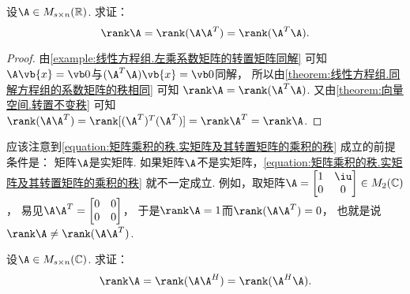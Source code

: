 \begin{example}
设\(\A \in M_{s \times n}(\mathbb{R})\).
求证：\begin{equation}\label{equation:矩阵乘积的秩.实矩阵及其转置矩阵的乘积的秩}
	\rank\A = \rank(\A \A^T) = \rank(\A^T \A).
\end{equation}
\begin{proof}
由\cref{example:线性方程组.左乘系数矩阵的转置矩阵同解} 可知
\(\A \vb{x} = \vb0\)与\((\A^T \A) \vb{x} = \vb0\)同解，
所以由\cref{theorem:线性方程组.同解方程组的系数矩阵的秩相同} 可知
\(\rank\A = \rank(\A^T \A)\).
又由\cref{theorem:向量空间.转置不变秩} 可知
\(\rank(\A \A^T)
= \rank[(\A^T)^T (\A^T)]
= \rank\A^T
= \rank\A\).
\end{proof}
\end{example}
\begin{remark}
应该注意到\cref{equation:矩阵乘积的秩.实矩阵及其转置矩阵的乘积的秩} 成立的前提条件是：
矩阵\(\A\)是实矩阵.
如果矩阵\(\A\)不是实矩阵，\cref{equation:矩阵乘积的秩.实矩阵及其转置矩阵的乘积的秩} 就不一定成立.
例如，取矩阵\(\A = \begin{bmatrix}
	1 & \iu \\
	0 & 0
\end{bmatrix}
\in M_2(\mathbb{C})\)，
易见\(\A \A^T = \begin{bmatrix}
	0 & 0 \\
	0 & 0
\end{bmatrix}\)，
于是\(\rank\A=1\)而\(\rank(\A\A^T)=0\)，
也就是说\(\rank\A\neq\rank(\A\A^T)\).
\end{remark}
\begin{example}
设\(\A \in M_{s \times n}(\mathbb{C})\).
求证：\begin{equation}
	\rank\A = \rank(\A \A^H) = \rank(\A^H \A).
\end{equation}
\end{example}
